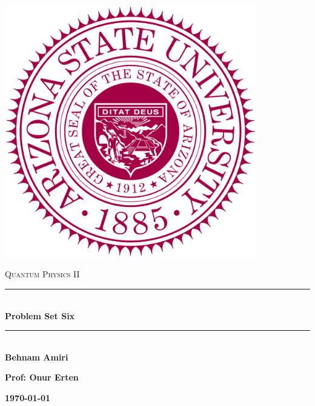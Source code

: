 \documentclass[fleqn]{article}
\begin{document}
  \begin{titlepage}

    \newcommand{\HRule}{\rule{\linewidth}{0.5mm}}

    \center

    \begin{center}
      \includegraphics[height=11cm, width=11cm]{asu.png}
    \end{center}

    \vline

    \textsc{\LARGE Quantum Physics II}\\[1.5cm]

    \HRule \\[0.5cm]
    { \huge \bfseries Problem Set Six}\\[0.4cm] 
    \HRule \\[1.0cm]

    \textbf{Behnam Amiri}

    \bigbreak

    \textbf{Prof: Onur Erten}

    \bigbreak

    \textbf{{\large \today}\\[2cm]}

    \vfill

  \end{titlepage}
\end{document}
